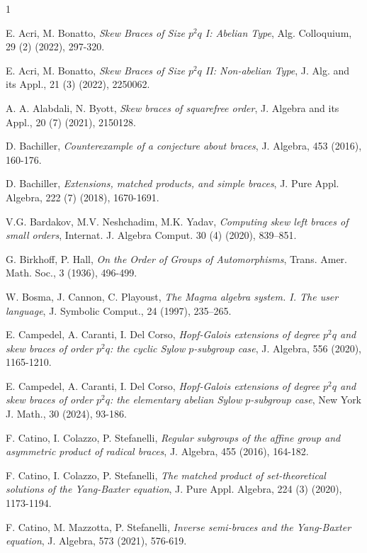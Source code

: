 \documentclass[12pt]{article}
\theoremstyle{definition}
\begin{document}
\begin{thebibliography}{1}

 E. Acri, M. Bonatto, \emph{Skew Braces of Size $p^2q$ I: Abelian Type}, Alg. Colloquium, 29 (2) (2022), 297-320.

 E. Acri, M. Bonatto, \emph{Skew Braces of Size $p^2q$ II: Non-abelian Type}, J. Alg. and its Appl., 21 (3) (2022), 2250062.

 A. A. Alabdali, N. Byott, \emph{Skew braces of squarefree order}, J. Algebra and its Appl., 20 (7) (2021), 2150128.

 D. Bachiller, \emph{Counterexample of a conjecture about braces}, J. Algebra, 453 (2016), 160-176.

 D. Bachiller, \emph{Extensions, matched products, and simple braces}, J. Pure Appl. Algebra, 222 (7) (2018), 1670-1691.
 	
 V.G. Bardakov, M.V. Neshchadim, M.K. Yadav, \emph{Computing skew left braces of small orders}, Internat. J. Algebra Comput. 30 (4) (2020), 839–851.

 G. Birkhoff, P. Hall, \emph{On the Order of Groups of Automorphisms}, Trans. Amer. Math. Soc., 3 (1936), 496-499.

 W. Bosma, J. Cannon, C. Playoust, \emph{The Magma algebra system. I. The user language}, J. Symbolic Comput., 24 (1997), 235–265.

 E. Campedel, A. Caranti, I. Del Corso, \emph{Hopf-Galois extensions of degree $p^2q$ and skew braces of order $p^2q$: the cyclic Sylow $p$-subgroup case}, J. Algebra, 556 (2020), 1165-1210.

 E. Campedel, A. Caranti, I. Del Corso, \emph{Hopf-Galois extensions of degree $p^2q$ and skew braces of order $p^2q$: the elementary abelian Sylow $p$-subgroup case}, New York J. Math., 30 (2024), 93-186.

 F. Catino, I. Colazzo, P. Stefanelli, \emph{Regular subgroups of the affine group and asymmetric product of radical braces}, J. Algebra, 455 (2016), 164-182.

 F. Catino, I. Colazzo, P. Stefanelli, \emph{The matched product of set-theoretical solutions of the Yang-Baxter equation}, J. Pure Appl. Algebra, 224 (3)  (2020), 1173-1194.

 F. Catino, M. Mazzotta, P. Stefanelli, \emph{Inverse semi-braces and the Yang-Baxter equation}, J. Algebra, 573 (2021), 576-619.


\end{thebibliography}
\end{document}
